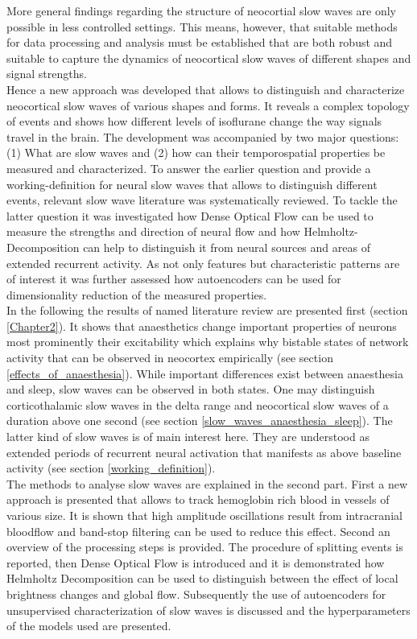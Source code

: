 More general findings regarding the structure of neocortial slow waves are only possible in less controlled settings. This means, however, that suitable methods for data processing and analysis must be established that are both robust and suitable to capture the dynamics of neocortical slow waves of different shapes and signal strengths.\\
Hence a new approach was developed that allows to distinguish and characterize neocortical slow waves of various shapes and forms. It reveals a complex topology of events and shows how different levels of isoflurane change the way signals travel in the brain. The development was accompanied by two major questions: (1) What are slow waves and  (2) how can their temporospatial properties be measured and characterized. To answer the earlier question and provide a working-definition for neural slow waves that allows to distinguish different events, relevant slow wave literature was systematically reviewed. To tackle the latter question it was investigated how Dense Optical Flow can be used to measure the strengths and direction of neural flow and how Helmholtz-Decomposition can help to distinguish it from neural sources and areas of extended recurrent activity. As not only features but characteristic patterns are of interest it was further assessed how autoencoders can be used for dimensionality reduction of the measured properties.\\
In the following the results of named literature review are presented first (section \ref{Chapter2}). It shows that anaesthetics change important properties of neurons most prominently their excitability which explains why bistable states of network activity that can be observed in neocortex empirically (see section \ref{effects_of_anaesthesia}). While important differences exist between anaesthesia and sleep, slow waves can be observed in both states. One may distinguish corticothalamic slow waves in the delta range and neocortical slow waves of a duration above one second (see section \ref{slow_waves_anaesthesia_sleep}). The latter kind of slow waves is of main interest here. They are understood as extended periods of recurrent neural activation that manifests as above baseline activity (see section \ref{working_definition}). \\
The methods to analyse slow waves are explained in the second part. First a new approach is presented that allows to track hemoglobin rich blood in vessels of various size. It is shown that high amplitude oscillations result from intracranial bloodflow and band-stop filtering can be used to reduce this effect. Second an overview of the processing steps is provided. The procedure of splitting events is reported, then Dense Optical Flow is introduced and it is demonstrated how Helmholtz Decomposition can be used to distinguish between the effect of local brightness changes and global flow. Subsequently the use of autoencoders for unsupervised characterization of slow waves is discussed and the hyperparameters of the models used are presented. \\
